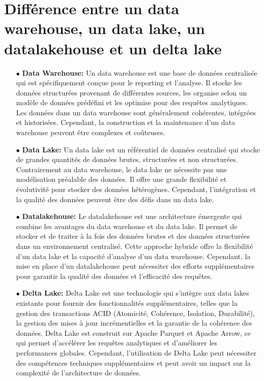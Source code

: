\section{Différence entre un data warehouse, un data lake, un datalakehouse et un delta lake}
\begin{enumerate}
    \item[$\bullet$] \textbf{Data Warehouse:} Un data warehouse est une base de données centralisée qui est spécifiquement conçue pour le reporting et l'analyse. Il stocke les données structurées provenant de différentes sources, les organise selon un modèle de données prédéfini et les optimise pour des requêtes analytiques. Les données dans un data warehouse sont généralement cohérentes, intégrées et historisées. Cependant, la construction et la maintenance d'un data warehouse peuvent être complexes et coûteuses.
    \item[$\bullet$] \textbf{Data Lake:} Un data lake est un référentiel de données centralisé qui stocke de grandes quantités de données brutes, structurées et non structurées. Contrairement au data warehouse, le data lake ne nécessite pas une modélisation préalable des données. Il offre une grande flexibilité et évolutivité pour stocker des données hétérogènes. Cependant, l'intégration et la qualité des données peuvent être des défis dans un data lake.
    \item[$\bullet$] \textbf{Datalakehouse:} Le datalakehouse est une architecture émergente qui combine les avantages du data warehouse et du data lake. Il permet de stocker et de traiter à la fois des données brutes et des données structurées dans un environnement centralisé. Cette approche hybride offre la flexibilité d'un data lake et la capacité d'analyse d'un data warehouse. Cependant, la mise en place d'un datalakehouse peut nécessiter des efforts supplémentaires pour garantir la qualité des données et l'efficacité des requêtes.
    \item[$\bullet$] \textbf{Delta Lake:} Delta Lake est une technologie qui s'intègre aux data lakes existants pour fournir des fonctionnalités supplémentaires, telles que la gestion des transactions ACID (Atomicité, Cohérence, Isolation, Durabilité), la gestion des mises à jour incrémentielles et la garantie de la cohérence des données. Delta Lake est construit sur Apache Parquet et Apache Arrow, ce qui permet d'accélérer les requêtes analytiques et d'améliorer les performances globales. Cependant, l'utilisation de Delta Lake peut nécessiter des compétences techniques supplémentaires et peut avoir un impact sur la complexité de l'architecture de données. 
\end{enumerate}


